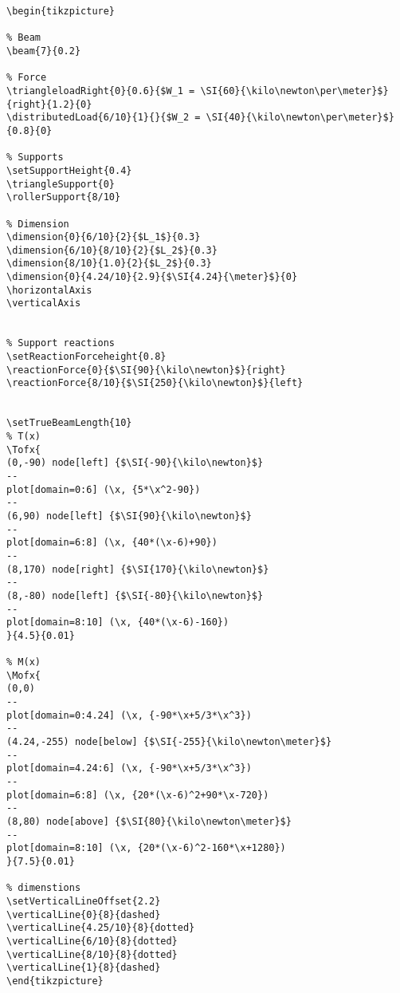 \documentclass{article}
\begin{document}
\begin{verbatim}
\begin{tikzpicture}

% Beam
\beam{7}{0.2}

% Force
\triangleloadRight{0}{0.6}{$W_1 = \SI{60}{\kilo\newton\per\meter}$}{right}{1.2}{0}
\distributedLoad{6/10}{1}{}{$W_2 = \SI{40}{\kilo\newton\per\meter}$}{0.8}{0}

% Supports
\setSupportHeight{0.4}
\triangleSupport{0}
\rollerSupport{8/10}

% Dimension
\dimension{0}{6/10}{2}{$L_1$}{0.3}
\dimension{6/10}{8/10}{2}{$L_2$}{0.3}
\dimension{8/10}{1.0}{2}{$L_2$}{0.3}
\dimension{0}{4.24/10}{2.9}{$\SI{4.24}{\meter}$}{0}
\horizontalAxis
\verticalAxis


% Support reactions
\setReactionForceheight{0.8}
\reactionForce{0}{$\SI{90}{\kilo\newton}$}{right}
\reactionForce{8/10}{$\SI{250}{\kilo\newton}$}{left}


\setTrueBeamLength{10}
% T(x)
\Tofx{
(0,-90) node[left] {$\SI{-90}{\kilo\newton}$}
--
plot[domain=0:6] (\x, {5*\x^2-90})
--
(6,90) node[left] {$\SI{90}{\kilo\newton}$}
--
plot[domain=6:8] (\x, {40*(\x-6)+90})
--
(8,170) node[right] {$\SI{170}{\kilo\newton}$}
--
(8,-80) node[left] {$\SI{-80}{\kilo\newton}$}
--
plot[domain=8:10] (\x, {40*(\x-6)-160})
}{4.5}{0.01}

% M(x)
\Mofx{
(0,0)
--
plot[domain=0:4.24] (\x, {-90*\x+5/3*\x^3})
--
(4.24,-255) node[below] {$\SI{-255}{\kilo\newton\meter}$}
--
plot[domain=4.24:6] (\x, {-90*\x+5/3*\x^3})
--
plot[domain=6:8] (\x, {20*(\x-6)^2+90*\x-720})
--
(8,80) node[above] {$\SI{80}{\kilo\newton\meter}$}
--
plot[domain=8:10] (\x, {20*(\x-6)^2-160*\x+1280})
}{7.5}{0.01}

% dimenstions
\setVerticalLineOffset{2.2}
\verticalLine{0}{8}{dashed}
\verticalLine{4.25/10}{8}{dotted}
\verticalLine{6/10}{8}{dotted}
\verticalLine{8/10}{8}{dotted}
\verticalLine{1}{8}{dashed}
\end{tikzpicture}
\end{verbatim}
\end{document}
